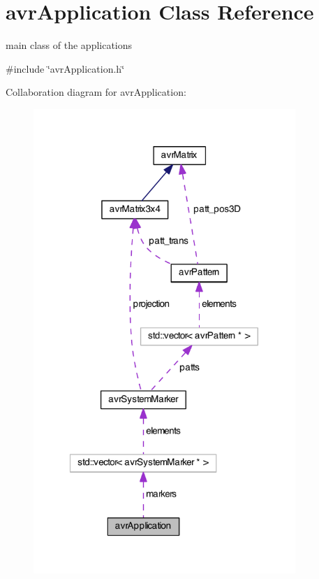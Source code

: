 \hypertarget{classavr_application}{\section{avr\-Application Class Reference}
\label{classavr_application}
}


main class of the applications  




{\ttfamily \#include \char`\"{}avr\-Application.\-h\char`\"{}}



Collaboration diagram for avr\-Application\-:\nopagebreak
\begin{figure}[H]
\begin{center}
\leavevmode
\includegraphics[width=281pt]{classavr_application__coll__graph}
\end{center}
\end{figure}
